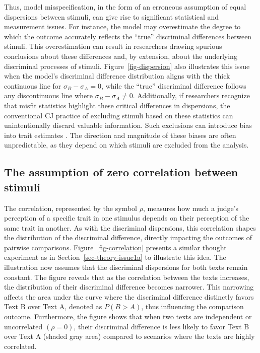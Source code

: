 \documentclass[
  authoryear,
  review,
  1p]{elsarticle}
\begin{document}
Thus, model misspecification, in the form of an erroneous assumption of
equal dispersions between stimuli, can give rise to significant
statistical and measurement issues. For instance, the model may
overestimate the degree to which the outcome accurately reflects the
``true'' discriminal differences between stimuli. This overestimation
can result in researchers drawing spurious conclusions about these
differences \citep[pp.~370]{McElreath_2020} and, by extension, about the
underlying discriminal processes of stimuli. Figure~\ref{fig-dispersion}
also illustrates this issue when the model's discriminal difference
distribution aligns with the thick continuous line for
\(\sigma_{B}-\sigma_{A}=0\), while the ``true'' discriminal difference
follows any discontinuous line where \(\sigma_{B}-\sigma_{A} \neq 0\).
Additionally, if researchers recognize that misfit statistics highlight
these critical differences in dispersions, the conventional CJ practice
of excluding stimuli based on these statistics
\citep{Pollitt_2012a, Pollitt_2012b, vanDaal_et_al_2016, Goossens_et_al_2018}
can unintentionally discard valuable information. Such exclusions can
introduce bias into trait estimates
\citep[chap.~12]{Zimmerman_1994, McElreath_2020}. The direction and
magnitude of these biases are often unpredictable, as they depend on
which stimuli are excluded from the analysis.

\subsection{The assumption of zero correlation between
stimuli}\label{sec-theory-issue1b}

The correlation, represented by the symbol \(\rho\), measures how much a
judge's perception of a specific trait in one stimulus depends on their
perception of the same trait in another. As with the discriminal
dispersions, this correlation shapes the distribution of the discriminal
difference, directly impacting the outcomes of pairwise comparisons.
Figure~\ref{fig-correlation} presents a similar thought experiment as in
Section~\ref{sec-theory-issue1a} to illustrate this idea. The
illustration now assumes that the discriminal dispersions for both texts
remain constant. The figure reveals that as the correlation between the
texts increases, the distribution of their discriminal difference
becomes narrower. This narrowing affects the area under the curve where
the discriminal difference distinctly favors Text B over Text A, denoted
as \(P(B > A)\), thus influencing the comparison outcome. Furthermore,
the figure shows that when two texts are independent or uncorrelated
\((\rho=0)\), their discriminal difference is less likely to favor Text
B over Text A (shaded gray area) compared to scenarios where the texts
are highly correlated.
\end{document}

